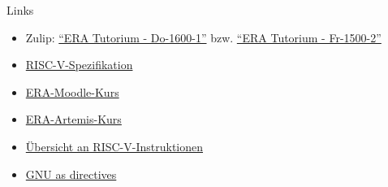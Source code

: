 \documentclass[
  german,            %
  aspectratio=169,    %
]{tumbeamer}
\begin{document}
\begin{frame}[c, fragile]{Links}{}
  \begin{itemize}
    \item Zulip: \href{https://zulip.in.tum.de/#narrow/stream/2661-ERA-Tutorium---Do-1600-1}{\enquote{ERA Tutorium - Do-1600-1}}
          bzw. \href{https://zulip.in.tum.de/#narrow/stream/2675-ERA-Tutorium---Fr-1500-2 }{\enquote{ERA Tutorium - Fr-1500-2}}
    \item \href{https://riscv.org/wp-content/uploads/2017/05/riscv-spec-v2.2.pdf}{RISC-V-Spezifikation}
    \item \href{https://www.moodle.tum.de/course/view.php?id=100633}{ERA-Moodle-Kurs}
    \item \href{https://artemis.in.tum.de/courses/401}{ERA-Artemis-Kurs}
    \item \href{https://msyksphinz-self.github.io/riscv-isadoc/html/index.html}{Übersicht an RISC-V-Instruktionen}
    \item \href{https://ftp.gnu.org/old-gnu/Manuals/gas/html_chapter/as_7.html}{GNU as directives}
  \end{itemize}
\end{frame}

\maketitle
\end{document}
